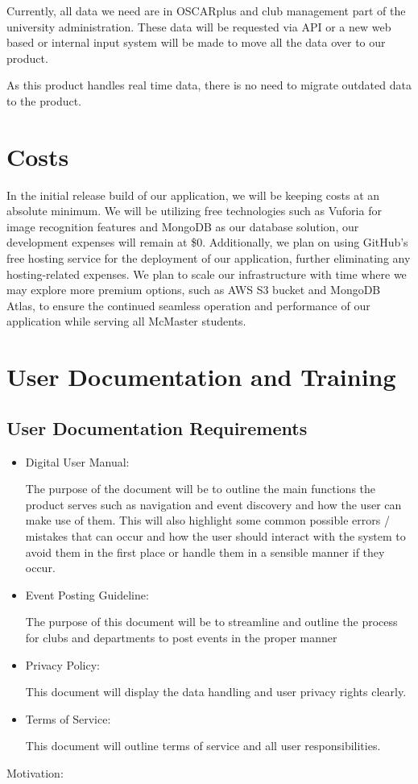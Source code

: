 \documentclass[12pt]{article}
\begin{document}
\qquad Currently, all data we need are in OSCARplus and club management part of the university administration.
These data will be requested via API or a new web based or internal input system will be made to move all the data over to our product.

As this product handles real time data, there is no need to migrate outdated data to the product.

\section{Costs}

In the initial release build of our application, we will be keeping costs at an absolute minimum. We will be utilizing free technologies such as Vuforia for image recognition features and MongoDB as our database solution, our development expenses will remain at \$0. Additionally, we plan on using GitHub's free hosting service for the deployment of our application, further eliminating any hosting-related expenses. We plan to scale our infrastructure with time where we may explore more premium options, such as AWS S3 bucket and MongoDB Atlas, to ensure the continued seamless operation and performance of our application while serving all McMaster students.

\section{User Documentation and Training}
\subsection{User Documentation Requirements}

\begin{itemize}

\item Digital User Manual:

The purpose of the document will be to outline the main functions the product serves such as navigation and event discovery and how the user can make use of them. This will also highlight some common possible errors / mistakes that can occur and how the user should interact with the system to avoid them in the first place or handle them in a sensible manner if they occur.

 

\item Event Posting Guideline:

The purpose of this document will be to streamline and outline the process for clubs and departments to post events in the proper manner

\item Privacy Policy:

This document will display the data handling and user privacy rights clearly.

 

\item Terms of Service:

This document will outline terms of service and all user responsibilities.

\end{itemize}
Motivation:
\end{document}
